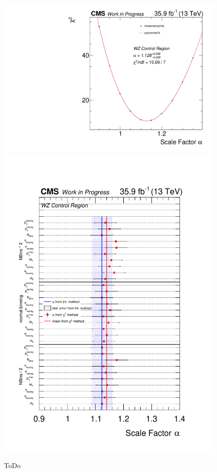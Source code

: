 \begin{figure}[htb]
 \centering
 \includegraphics[width=\pairwidth]{figures/plots_CR/chi/WZ_met}
 \includegraphics[width=\pairwidth]{figures/plots_CR/chi/WZ_Compare}
 \caption{ToDo}
 \label{fig:chiWZ}
\end{figure}


